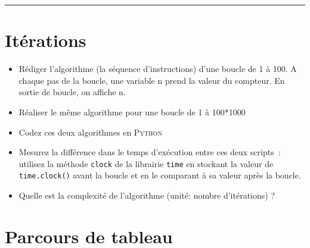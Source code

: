 
\newcommand{\numTD}{TD5}
\newcommand{\themeTD}{Complexité}


\hrule

\noindent{}

\section{Itérations}

\begin{itemize}
  \item  Rédiger l'algorithme (la séquence d'instructions) d'une boucle de 1 à 100.  A chaque pas de la boucle, une variable n prend la valeur du compteur. En sortie de boucle, on affiche n.
  \item  Réaliser le même algorithme pour une boucle de 1 à 100*1000
  \item  Codez ces deux algorithmes en \textsc{Python}
  \item  Mesurez la différence dans le temps d'exécution entre ces deux scripts : utilisez la méthode \texttt{clock} de la librairie \texttt{time} en stockant la valeur de \texttt{time.clock()} avant la boucle et en le comparant à sa valeur après la boucle.
  \item  Quelle est la complexité de l'algorithme (unité: nombre d'itérations) ?
\end{itemize}

\section{Parcours de tableau}

